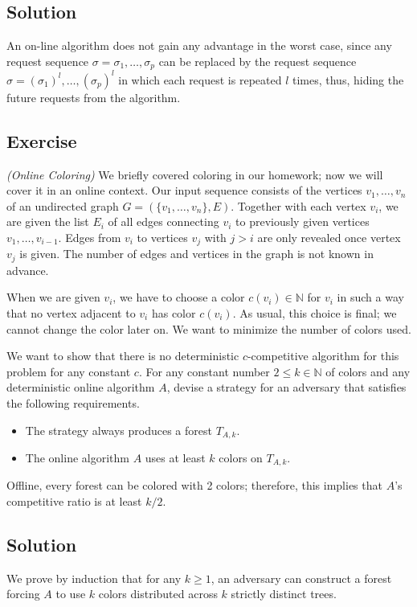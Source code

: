 \documentclass[14pt]{extreport}
\newcounter{counter}
\newcommand{\Exercise}{Exercise \stepcounter{counter}\thecounter}
\begin{document}
\subsection*{Solution}
    An on-line algorithm does not gain any advantage in the worst case, since any request sequence $\sigma = \sigma_{1}, \dots, \sigma_{p}$ can be replaced by the request sequence $\sigma = (\sigma_{1})^{l}, \dots, (\sigma_{p})^{l}$ in which each request is repeated $l$ times, thus, hiding the future requests from the algorithm.

\subsection*{\Exercise}
    \textit{(Online Coloring)} We briefly covered coloring in our homework; now we will cover it in an online context. Our input sequence consists of the vertices $v_1, \ldots, v_n$ of an undirected graph $G = (\{v_1, \ldots, v_n\}, E)$. Together with each vertex $v_i$, we are given the list $E_i$ of all edges connecting $v_i$ to previously given vertices $v_1, \ldots, v_{i-1}$. Edges from $v_i$ to vertices $v_j$ with $j > i$ are only revealed once vertex $v_j$ is given. The number of edges and vertices in the graph is not known in advance.

    \vspace{5mm}
    When we are given $v_i$, we have to choose a color $c(v_i) \in \mathbb{N}$ for $v_i$ in such a way that no vertex adjacent to $v_i$ has color $c(v_i)$. As usual, this choice is final; we cannot change the color later on. We want to minimize the number of colors used.

    \vspace{5mm}
    We want to show that there is no deterministic $c$-competitive algorithm for this problem for any constant $c$. For any constant number $2 \leq k \in \mathbb{N}$ of colors and any deterministic online algorithm $A$, devise a strategy for an adversary that satisfies the following requirements.
    \begin{itemize}
      \item The strategy always produces a forest $T_{A,k}$.
      \item The online algorithm $A$ uses at least $k$ colors on $T_{A,k}$.
    \end{itemize}
    Offline, every forest can be colored with 2 colors; therefore, this implies that $A$'s competitive ratio is at least $k/2$.

\subsection*{Solution}
    We prove by induction that for any $k \geq 1$, an adversary can construct a forest forcing $A$ to use $k$ colors distributed across $k$ strictly distinct trees.
\end{document}
